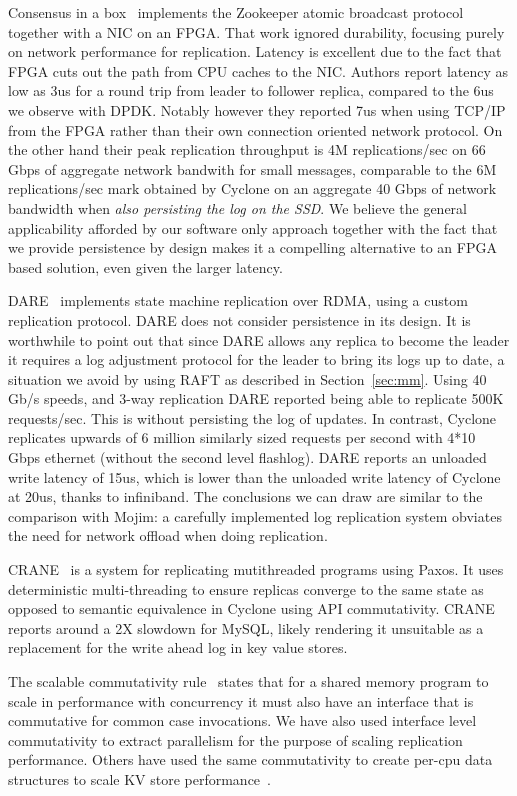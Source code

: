 \documentclass[pageno]{jpaper}
\begin{document}
Consensus in a box~\cite{consensus_box} implements the Zookeeper atomic
broadcast protocol together with a NIC on an FPGA. That work ignored durability,
focusing purely on network performance for replication. Latency is excellent due
to the fact that FPGA cuts out the path from CPU caches to the NIC. Authors
report latency as low as 3us for a round trip from leader to follower replica,
compared to the 6us we observe with DPDK. Notably however they reported 7us when
using TCP/IP from the FPGA rather than their own connection oriented network
protocol. On the other hand their peak replication throughput is 4M
replications/sec on 66 Gbps of aggregate network bandwith for small messages,
comparable to the 6M replications/sec mark obtained by Cyclone on an aggregate
40 Gbps of network bandwidth when \emph{also persisting the log on the SSD}. We
believe the general applicability afforded by our software only approach
together with the fact that we provide persistence by design makes it a
compelling alternative to an FPGA based solution, even given the larger latency.

DARE~\cite{dare} implements state machine replication over RDMA, using a custom
replication protocol. DARE does not consider persistence in its design. It is
worthwhile to point out that since DARE allows any replica to become the leader
it requires a log adjustment protocol for the leader to bring its logs up to
date, a situation we avoid by using RAFT as described in
Section~\ref{sec:mm}. Using 40 Gb/s speeds, and 3-way replication DARE reported
being able to replicate 500K requests/sec. This is without persisting the log of
updates. In contrast, Cyclone replicates upwards of 6 million similarly sized
requests per second with 4*10 Gbps ethernet (without the second level
flashlog). DARE reports an unloaded write latency of 15us, which is lower than
the unloaded write latency of Cyclone at 20us, thanks to infiniband. The
conclusions we can draw are similar to the comparison with Mojim: a carefully
implemented log replication system obviates the need for network offload when
doing replication.

{CRANE}~\cite{crane} is a system for replicating mutithreaded programs using
Paxos. It uses deterministic multi-threading to ensure replicas converge to the
same state as opposed to semantic equivalence in Cyclone using API
commutativity.  CRANE reports around a 2X slowdown for MySQL, likely rendering
it unsuitable as a replacement for the write ahead log in key value stores.

The scalable commutativity rule~\cite{scalable_commutativity} states that for a
shared memory program to scale in performance with concurrency it must also have
an interface that is commutative for common case invocations. We have also used
interface level commutativity to extract parallelism for the purpose of scaling
replication performance. Others have used the same commutativity to create
per-cpu data structures to scale KV store performance~\cite{flodb}.
\end{document}
